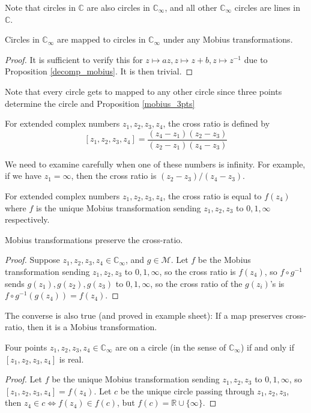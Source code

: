 Note that circles in $\mathbb C$ are also circles in $\mathbb C_\infty$, and all other $\mathbb C_\infty$ circles are lines in $\mathbb C$.
\begin{proposition}
    Circles in $\mathbb C_\infty$ are mapped to circles in $\mathbb C_\infty$ under any Mobius transformations.
\end{proposition}
\begin{proof}
    It is sufficient to verify this for $z\mapsto az,z\mapsto z+b,z\mapsto z^{-1}$ due to Proposition \ref{decomp_mobius}.
    It is then trivial.
\end{proof}
Note that every circle gets to mapped to any other circle since three points determine the circle and Proposition \ref{mobius_3pts}
\begin{definition}
    For extended complex numbers $z_1,z_2,z_3,z_4$, the cross ratio is defined by
    $$[z_1,z_2,z_3,z_4]=\frac{(z_4-z_1)(z_2-z_3)}{(z_2-z_1)(z_4-z_3)}$$
\end{definition}
We need to examine carefully when one of these numbers is infinity.
For example, if we have $z_1=\infty$, then the cross ratio is $(z_2-z_3)/(z_4-z_3)$.
\begin{corollary}
    For extended complex numbers $z_1,z_2,z_3,z_4$, the cross ratio is equal to $f(z_4)$ where $f$ is the unique Mobius transformation sending $z_1,z_2,z_3$ to $0,1,\infty$ respectively.
\end{corollary}
\begin{theorem}
    Mobius transformations preserve the cross-ratio.
\end{theorem}
\begin{proof}
    Suppose $z_1,z_2,z_3,z_4\in\mathbb C_\infty$, and $g\in\mathcal M$.
    Let $f$ be the Mobius transformation sending $z_1,z_2,z_3$ to $0,1,\infty$, so the cross ratio is $f(z_4)$, so $f\circ g^{-1}$ sends $g(z_1),g(z_2),g(z_3)$ to $0,1,\infty$, so the cross ratio of the $g(z_i)$'s is $f\circ g^{-1}(g(z_4))=f(z_4)$.
\end{proof}
The converse is also true (and proved in example sheet): If a map preserves cross-ratio, then it is a Mobius transformation.
\begin{corollary}
    Four points $z_1,z_2,z_3,z_4\in\mathbb C_\infty$ are on a circle (in the sense of $\mathbb C_\infty$) if and only if $[z_1,z_2,z_3,z_4]$ is real.
\end{corollary}
\begin{proof}
    Let $f$ be the unique Mobius transformation sending $z_1,z_2,z_3$ to $0,1,\infty$, so $[z_1,z_2,z_3,z_4]=f(z_4)$.
    Let $c$ be the unique circle passing through $z_1,z_2,z_3$, then $z_4\in c\iff f(z_4)\in f(c)$, but $f(c)=\mathbb R\cup\{\infty\}$.
\end{proof}